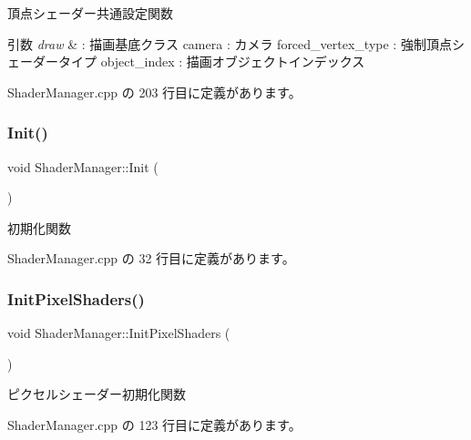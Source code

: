 頂点シェーダー共通設定関数 


\begin{DoxyParams}{引数}
{\em draw} & \+: 描画基底クラス camera \+: カメラ forced\+\_\+vertex\+\_\+type \+: 強制頂点シェーダータイプ object\+\_\+index \+: 描画オブジェクトインデックス \\
\hline
\end{DoxyParams}


 Shader\+Manager.\+cpp の 203 行目に定義があります。

\mbox{\label{class_shader_manager_a8e8fd62a28cc18addcd5ec6507a5dcb0}} 
\subsubsection{\texorpdfstring{Init()}{Init()}}
{\footnotesize\ttfamily void Shader\+Manager\+::\+Init (\begin{DoxyParamCaption}{ }\end{DoxyParamCaption})}



初期化関数 



 Shader\+Manager.\+cpp の 32 行目に定義があります。

\mbox{\label{class_shader_manager_a6e1c2dc6c381081bc0e5ef1624b8e0f0}} 
\subsubsection{\texorpdfstring{Init\+Pixel\+Shaders()}{InitPixelShaders()}}
{\footnotesize\ttfamily void Shader\+Manager\+::\+Init\+Pixel\+Shaders (\begin{DoxyParamCaption}{ }\end{DoxyParamCaption})\hspace{0.3cm}{\ttfamily [private]}}



ピクセルシェーダー初期化関数 



 Shader\+Manager.\+cpp の 123 行目に定義があります。

\mbox{\label{class_shader_manager_a9881e89daff32662e10f6ac48212ca06}} 
